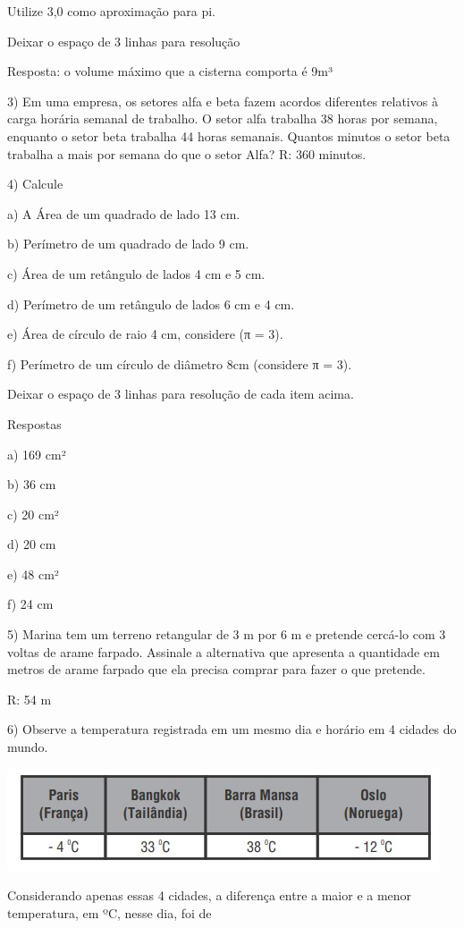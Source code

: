 Utilize 3,0 como aproximação para pi.

Deixar o espaço de 3 linhas para resolução

Resposta: o volume máximo que a cisterna comporta é 9m³

3) Em uma empresa, os setores alfa e beta fazem acordos diferentes
relativos à carga horária semanal de trabalho. O setor alfa trabalha 38
horas por semana, enquanto o setor beta trabalha 44 horas semanais.
Quantos minutos o setor beta trabalha a mais por semana do que o setor
Alfa? R: 360 minutos.

4) Calcule

a) A Área de um quadrado de lado 13 cm.

b) Perímetro de um quadrado de lado 9 cm.

c) Área de um retângulo de lados 4 cm e 5 cm.

d) Perímetro de um retângulo de lados 6 cm e 4 cm.

e) Área de círculo de raio 4 cm, considere (π = 3).

f) Perímetro de um círculo de diâmetro 8cm (considere π = 3).

Deixar o espaço de 3 linhas para resolução de cada item acima.

Respostas

a) 169 cm²

b) 36 cm

c) 20 cm²

d) 20 cm

e) 48 cm²

f) 24 cm

5) Marina tem um terreno retangular de 3 m por 6 m e pretende cercá-lo
com 3 voltas de arame farpado. Assinale a alternativa que apresenta a
quantidade em metros de arame farpado que ela precisa comprar para fazer
o que pretende.

R: 54 m

6) Observe a temperatura registrada em um mesmo dia e horário em 4
cidades do mundo.

\includegraphics[width=5.03125in,height=1.1875in]{./imgSAEB_6_MAT/media/image96.png}

Considerando apenas essas 4 cidades, a diferença entre a maior e a menor
temperatura, em ºC, nesse dia, foi de

